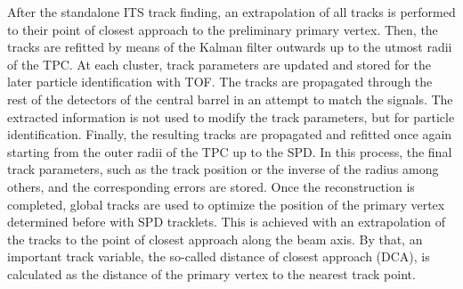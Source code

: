 \documentclass[12pt,a4paper]{report}
\begin{document}
After the standalone ITS track finding, an extrapolation of all tracks is performed to their point of closest approach to the preliminary primary vertex. Then, the tracks are refitted by means of the Kalman filter outwards up to the utmost radii of the TPC. At each cluster, track parameters are updated and stored for the later particle identification with TOF. The tracks are propagated through the rest of the detectors of the central barrel in an attempt to match the signals. The extracted information is not used to modify the track parameters, but for particle identification. Finally, the resulting tracks are propagated and refitted once again starting from the outer radii of the TPC up to the SPD. In this process, the final track parameters, such as the track position or the inverse of the radius among others, and the corresponding errors are stored. Once the reconstruction is completed, global tracks are used to optimize the position of the primary vertex determined before with SPD tracklets. This is achieved with an extrapolation of the tracks to the point of closest approach along the beam axis. By that, an important track variable, the so-called distance of closest approach (DCA), is calculated as the distance of the primary vertex to the nearest track point. 
\end{document}
